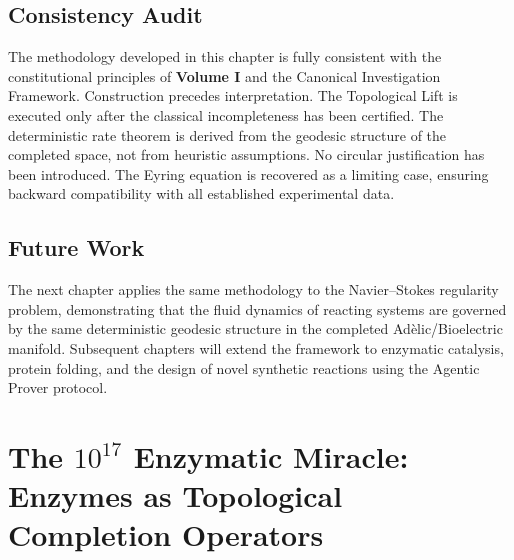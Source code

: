 \documentclass[11pt,openany]{extbook}
\newenvironment{consistencyaudit}{\section*{Consistency Audit}}{}
\newenvironment{futurework}{\section*{Future Work}}{}
\theoremstyle{plain}
\theoremstyle{definition}
\begin{document}
\begin{consistencyaudit}
\noindent The methodology developed in this chapter is fully consistent with the constitutional principles of \textbf{Volume I} and the Canonical Investigation Framework. Construction precedes interpretation. The Topological Lift is executed only after the classical incompleteness has been certified. The deterministic rate theorem is derived from the geodesic structure of the completed space, not from heuristic assumptions. No circular justification has been introduced. The Eyring equation is recovered as a limiting case, ensuring backward compatibility with all established experimental data.
\end{consistencyaudit}

\begin{futurework}
\noindent The next chapter applies the same methodology to the Navier--Stokes regularity problem, demonstrating that the fluid dynamics of reacting systems are governed by the same deterministic geodesic structure in the completed Adèlic/Bioelectric manifold. Subsequent chapters will extend the framework to enzymatic catalysis, protein folding, and the design of novel synthetic reactions using the Agentic Prover protocol.
\end{futurework}

\chapter{The $10^{17}$ Enzymatic Miracle: Enzymes as Topological Completion Operators}

\end{document}
